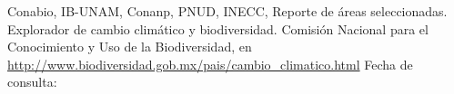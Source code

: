 \begin{titlepage}
\begin{flushleft}
\small{Conabio, IB-UNAM, Conanp, PNUD, INECC, Reporte de \'areas seleccionadas. Explorador de cambio clim\'atico y biodiversidad. Comisi\'on Nacional para el Conocimiento y Uso de la Biodiversidad, en \url{http://www.biodiversidad.gob.mx/pais/cambio_climatico.html} Fecha de consulta: }
\bigskip
\end{flushleft}








\end{titlepage}